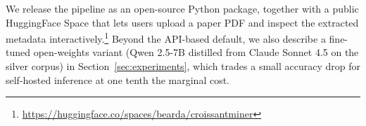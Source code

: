 We release the pipeline as an open-source Python package, together with a public HuggingFace Space that lets users upload a paper PDF and inspect the extracted metadata interactively.\footnote{\url{https://huggingface.co/spaces/bearda/croissantminer}} Beyond the API-based default, we also describe a fine-tuned open-weights variant (Qwen 2.5-7B distilled from Claude Sonnet 4.5 on the silver corpus) in Section~\ref{sec:experiments}, which trades a small accuracy drop for self-hosted inference at one tenth the marginal cost.
